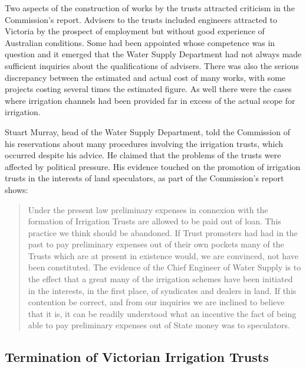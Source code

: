 Two aspects of the construction of works by the trusts attracted
criticism in the Commission's report.  Advisers to the trusts included
engineers attracted to Victoria by the prospect of employment but
without good experience of Australian conditions.  Some had been
appointed whose competence was in question and it emerged that the
Water Supply Department had not always made sufficient inquiries about
the qualifications of advisers.  There was also the serious
discrepancy between the estimated and actual cost of many works, with
some projects costing several times the estimated figure.  As well
there were the cases where irrigation channels had been provided far
in excess of the actual scope for irrigation.

Stuart Murray, head of the Water Supply Department, told the
Commission of his reservations about many procedures involving the
irrigation trusts, which occurred despite his advice.  He claimed that
the problems of the trusts were affected by political pressure.  His
evidence touched on the promotion of irrigation trusts in the
interests of land speculators, as part of the Commission's report
shows:
\begin{quote}
	Under the present law preliminary expenses in connexion with
	the formation of Irrigation Trusts are allowed to be paid out
	of loan.  This practice we think should be abandoned.  If
	Trust promoters had had in the past to pay preliminary
	expenses out of their own pockets many of the Trusts which are
	at present in existence would, we are convinced, not have been
	constituted.  The evidence of the Chief Engineer of Water
	Supply is to the effect that a great many of the irrigation
	schemes have been initiated in the interests, in the first
	place, of syndicates and dealers in land.  If this contention
	be correct, and from our inquiries we are inclined to believe
	that it is, it can be readily understood what an incentive the
	fact of being able to pay preliminary expenses out of State
	money was to speculators.
\end{quote}

\subsection*{Termination of Victorian Irrigation Trusts}

